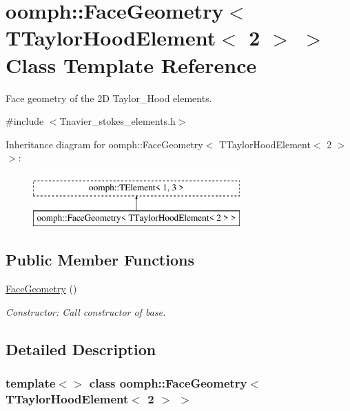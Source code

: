 \hypertarget{classoomph_1_1FaceGeometry_3_01TTaylorHoodElement_3_012_01_4_01_4}{}\section{oomph\+:\+:Face\+Geometry$<$ T\+Taylor\+Hood\+Element$<$ 2 $>$ $>$ Class Template Reference}
\label{classoomph_1_1FaceGeometry_3_01TTaylorHoodElement_3_012_01_4_01_4}


Face geometry of the 2D Taylor\+\_\+\+Hood elements.  




{\ttfamily \#include $<$Tnavier\+\_\+stokes\+\_\+elements.\+h$>$}

Inheritance diagram for oomph\+:\+:Face\+Geometry$<$ T\+Taylor\+Hood\+Element$<$ 2 $>$ $>$\+:\begin{figure}[H]
\begin{center}
\leavevmode
\includegraphics[height=2.000000cm]{classoomph_1_1FaceGeometry_3_01TTaylorHoodElement_3_012_01_4_01_4}
\end{center}
\end{figure}
\subsection*{Public Member Functions}
\begin{DoxyCompactItemize}
\item 
\hyperlink{classoomph_1_1FaceGeometry_3_01TTaylorHoodElement_3_012_01_4_01_4_a8d123f43002e6d961cdb8faffb671d4a}{Face\+Geometry} ()
\begin{DoxyCompactList}\small\item\em Constructor\+: Call constructor of base. \end{DoxyCompactList}\end{DoxyCompactItemize}


\subsection{Detailed Description}
\subsubsection*{template$<$$>$\newline
class oomph\+::\+Face\+Geometry$<$ T\+Taylor\+Hood\+Element$<$ 2 $>$ $>$}

